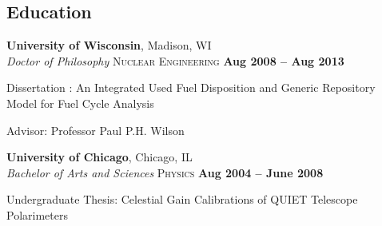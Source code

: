 \documentclass[margin,line]{resume}
\begin{document}
\begin{resume}
    \section{\mysidestyle Education}

    \textbf{University of Wisconsin}, Madison, WI \vspace{1mm}\\\vspace{1mm}%
    \textsl{Doctor of Philosophy} \textsc{Nuclear Engineering}\hfill \textbf{ Aug 2008 -- Aug 2013}\vspace{-3mm}\\\vspace{-1mm}%
    \begin{list2}
        \item Dissertation : An Integrated Used Fuel Disposition and Generic Repository Model for Fuel Cycle Analysis
        \item Advisor:  Professor Paul P.H. Wilson                
    \end{list2}\vspace{-1.5mm}
    \textbf{University of Chicago}, Chicago, IL \vspace{1mm}\\\vspace{1mm}%
    \textsl{Bachelor of Arts and Sciences}\textsc{ Physics} \hfill \textbf{Aug 2004 -- June 2008}\vspace{-3mm}\\\vspace{-1mm}%
    \begin{list2}
	\item Undergraduate Thesis: Celestial Gain Calibrations of QUIET Telescope Polarimeters
    \end{list2}\vspace{-1.5mm}


\end{resume}
\end{document}
